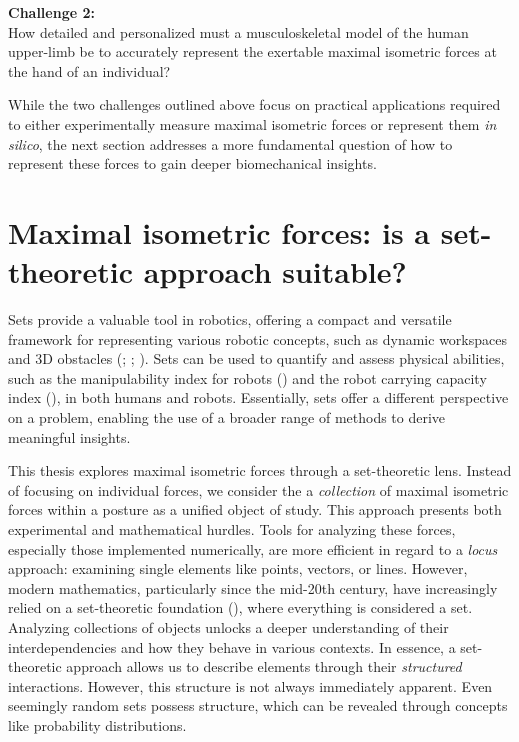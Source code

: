 \begin{mdframed}
    \begin{center}
        \textbf{Challenge 2:} \\
        How detailed and personalized must a musculoskeletal model of the human upper-limb be to accurately represent the exertable maximal isometric forces at the hand of an individual?
    \end{center}
\end{mdframed}

While the two challenges outlined above focus on practical applications required to either experimentally measure maximal isometric forces or represent them \emph{in silico}, the next section addresses a more fundamental question of how to represent these forces to gain deeper biomechanical insights.

\clearpage
\section*{Maximal isometric forces: is a set-theoretic approach suitable?}
Sets provide a valuable tool in robotics, offering a compact and versatile framework for representing various robotic concepts, such as dynamic workspaces and 3D obstacles (\cite{barretteDeterminationDynamicWorkspace2005}; \cite{lauWrenchClosureWorkspaceGeneration2011}; \cite{scottConstrainedZonotopesNew2016}). Sets can be used to quantify and assess physical abilities, such as the manipulability index for robots (\cite{yoshikawaManipulabilityRoboticMechanisms1985}) and the robot carrying capacity index (\cite{skuricCoupledViewPhysical}), in both humans and robots. Essentially, sets offer a different perspective on a problem, enabling the use of a broader range of methods to derive meaningful insights.

This thesis explores maximal isometric forces through a set-theoretic lens. Instead of focusing on individual forces, we consider the a \emph{collection} of maximal isometric forces within a posture as a unified object of study. This approach presents both experimental and mathematical hurdles. Tools for analyzing these forces, especially those implemented numerically, are more efficient in regard to a \emph{locus} approach: examining single elements like points, vectors, or lines. However, modern mathematics, particularly since the mid-20th century, have increasingly relied on a set-theoretic foundation (\cite{bourbakiTheorieEnsembles2006}), where everything is considered a set. Analyzing collections of objects unlocks a deeper understanding of their interdependencies and how they behave in various contexts. In essence, a set-theoretic approach allows us to describe elements through their \emph{structured} interactions. However, this structure is not always immediately apparent. Even seemingly random sets possess structure, which can be revealed through concepts like probability distributions.

